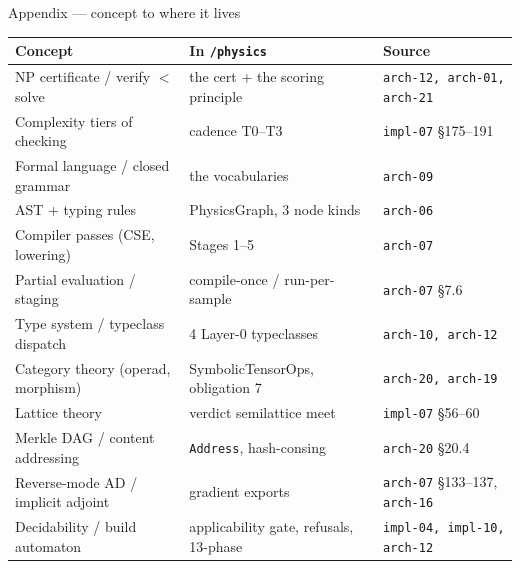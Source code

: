 \documentclass[aspectratio=169,10pt]{beamer}
\newcommand{\code}[1]{\texttt{#1}}
\begin{document}
\begin{frame}{Appendix --- concept to where it lives}
  \scriptsize
  \setlength{\tabcolsep}{5pt}
  \renewcommand{\arraystretch}{1.15}
  \begin{tabular}{@{}lll@{}}
    \toprule
    Concept & In \code{/physics} & Source\\
    \midrule
    NP certificate / verify $<$ solve     & the cert + the scoring principle        & \code{arch-12, arch-01, arch-21}\\
    Complexity tiers of checking          & cadence T0--T3                          & \code{impl-07} \S175--191\\
    Formal language / closed grammar      & the vocabularies                        & \code{arch-09}\\
    AST + typing rules                    & PhysicsGraph, 3 node kinds              & \code{arch-06}\\
    Compiler passes (CSE, lowering)       & Stages 1--5                             & \code{arch-07}\\
    Partial evaluation / staging          & compile-once / run-per-sample           & \code{arch-07} \S7.6\\
    Type system / typeclass dispatch      & 4 Layer-0 typeclasses                   & \code{arch-10, arch-12}\\
    Category theory (operad, morphism)    & SymbolicTensorOps, obligation 7         & \code{arch-20, arch-19}\\
    Lattice theory                        & verdict semilattice meet                & \code{impl-07} \S56--60\\
    Merkle DAG / content addressing       & \code{Address}, hash-consing            & \code{arch-20} \S20.4\\
    Reverse-mode AD / implicit adjoint    & gradient exports                        & \code{arch-07} \S133--137, \code{arch-16}\\
    Decidability / build automaton        & applicability gate, refusals, 13-phase  & \code{impl-04, impl-10, arch-12}\\
    \bottomrule
  \end{tabular}
\end{frame}
\end{document}
